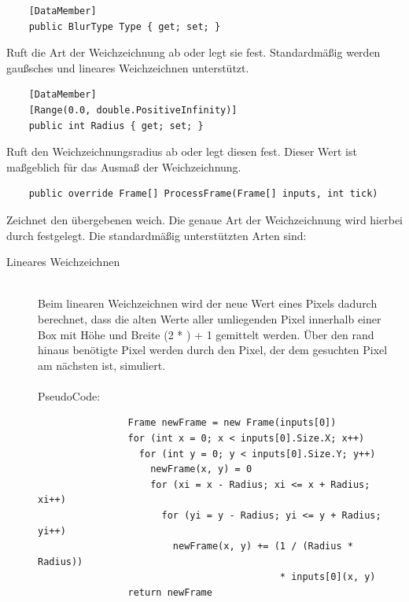 \begin{itemize}

	\begin{verbatim}
	[DataMember]
	public BlurType Type { get; set; }
	\end{verbatim}
	Ruft die Art der Weichzeichnung ab oder legt sie fest. Standardmäßig werden gaußsches und lineares Weichzeichnen unterstützt.
	
	\begin{verbatim}
	[DataMember]
	[Range(0.0, double.PositiveInfinity)]
	public int Radius { get; set; }
	\end{verbatim}
	Ruft den Weichzeichnungsradius ab oder legt diesen fest. Dieser Wert ist maßgeblich für das Ausmaß der Weichzeichnung.

	\begin{verbatim}
	public override Frame[] ProcessFrame(Frame[] inputs, int tick)
	\end{verbatim}
	Zeichnet den übergebenen  weich. Die genaue Art der Weichzeichnung wird hierbei durch  festgelegt. Die standardmäßig unterstützten Arten sind:
	\begin{description}
		\item[Lineares Weichzeichnen]~\\
			Beim linearen Weichzeichnen wird der neue Wert eines Pixels dadurch berechnet, dass die alten Werte aller umliegenden Pixel innerhalb einer Box mit Höhe und Breite (2 * ) + 1 gemittelt werden. Über den rand hinaus benötigte Pixel werden durch den Pixel, der dem gesuchten Pixel am nächsten ist, simuliert. ~\\~\\
			PseudoCode:
			\begin{verbatim}
				Frame newFrame = new Frame(inputs[0])
				for (int x = 0; x < inputs[0].Size.X; x++)
				  for (int y = 0; y < inputs[0].Size.Y; y++)
				    newFrame(x, y) = 0
				    for (xi = x - Radius; xi <= x + Radius; xi++)
				      for (yi = y - Radius; yi <= y + Radius; yi++)
				        newFrame(x, y) += (1 / (Radius * Radius))
				                           * inputs[0](x, y)
				return newFrame
				

\end{verbatim}
\end{description}
\end{itemize}
